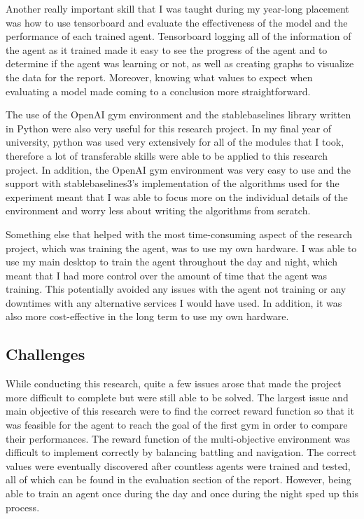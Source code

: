 Another really important skill that I was taught during my year-long placement was how to use tensorboard and evaluate the effectiveness of the model and the performance of each trained agent. Tensorboard logging all of the information of the agent as it trained made it easy to see the progress of the agent and to determine if the agent was learning or not, as well as creating graphs to visualize the data for the report. Moreover, knowing what values to expect when evaluating a model made coming to a conclusion more straightforward.  

The use of the OpenAI gym environment and the stablebaselines library written in Python were also very useful for this research project. In my final year of university, python was used very extensively for all of the modules that I took, therefore a lot of transferable skills were able to be applied to this research project. In addition, the OpenAI gym environment was very easy to use and the support with stablebaselines3's implementation of the algorithms used for the experiment meant that I was able to focus more on the individual details of the environment and worry less about writing the algorithms from scratch. 

Something else that helped with the most time-consuming aspect of the research project, which was training the agent, was to use my own hardware. I was able to use my main desktop to train the agent throughout the day and night, which meant that I had more control over the amount of time that the agent was training. This potentially avoided any issues with the agent not training or any downtimes with any alternative services I would have used. In addition, it was also more cost-effective in the long term to use my own hardware.

\subsection{Challenges}

While conducting this research, quite a few issues arose that made the project more difficult to complete but were still able to be solved. The largest issue and main objective of this research were to find the correct reward function so that it was feasible for the agent to reach the goal of the first gym in order to compare their performances. The reward function of the multi-objective environment was difficult to implement correctly by balancing battling and navigation. The correct values were eventually discovered after countless agents were trained and tested, all of which can be found in the evaluation section of the report. However, being able to train an agent once during the day and once during the night sped up this process. 

